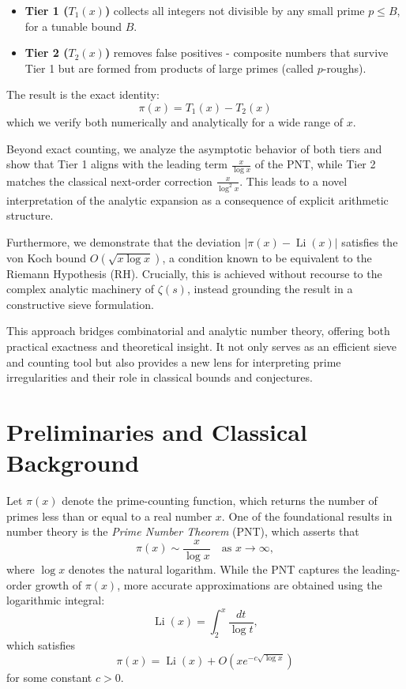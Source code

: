 \documentclass[11pt]{article}
\begin{document}
	\begin{itemize}
		\item \textbf{Tier 1 ($T_1(x)$)} collects all integers not divisible by any small prime $p \leq B$, for a tunable bound $B$.
		\item \textbf{Tier 2 ($T_2(x)$)} removes false positives - composite numbers that survive Tier 1 but are formed from products of large primes (called $p$-roughs).
	\end{itemize}
	
	The result is the exact identity:
	\[
	\pi(x) = T_1(x) - T_2(x)
	\]
	which we verify both numerically and analytically for a wide range of $x$.
	
	Beyond exact counting, we analyze the asymptotic behavior of both tiers and show that Tier 1 aligns with the leading term $\frac{x}{\log x}$ of the PNT, while Tier 2 matches the classical next-order correction $\frac{x}{\log^2 x}$. This leads to a novel interpretation of the analytic expansion as a consequence of explicit arithmetic structure.
	
	Furthermore, we demonstrate that the deviation $|\pi(x) - \operatorname{Li}(x)|$ satisfies the von Koch bound $O(\sqrt{x \log x})$, a condition known to be equivalent to the Riemann Hypothesis (RH). Crucially, this is achieved without recourse to the complex analytic machinery of $\zeta(s)$, instead grounding the result in a constructive sieve formulation.
	
	This approach bridges combinatorial and analytic number theory, offering both practical exactness and theoretical insight. It not only serves as an efficient sieve and counting tool but also provides a new lens for interpreting prime irregularities and their role in classical bounds and conjectures.
	
	
	\section{Preliminaries and Classical Background}
	
	Let \( \pi(x) \) denote the prime-counting function, which returns the number of primes less than or equal to a real number \( x \). One of the foundational results in number theory is the \textit{Prime Number Theorem} (PNT), which asserts that
	\[
	\pi(x) \sim \frac{x}{\log x} \quad \text{as } x \to \infty,
	\]
	where \( \log x \) denotes the natural logarithm. While the PNT captures the leading-order growth of \( \pi(x) \), more accurate approximations are obtained using the logarithmic integral:
	\[
	\operatorname{Li}(x) = \int_2^x \frac{dt}{\log t},
	\]
	which satisfies
	\[
	\pi(x) = \operatorname{Li}(x) + O\left(x e^{-c\sqrt{\log x}}\right)
	\]
	for some constant \( c > 0 \).
	
\end{document}
